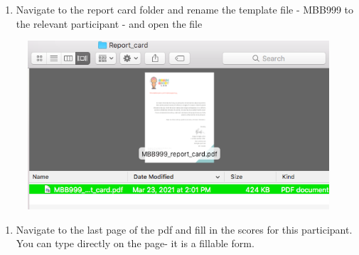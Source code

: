 \documentclass[]{book}
\providecommand{\tightlist}{%
  \setlength{\itemsep}{0pt}\setlength{\parskip}{0pt}}
\begin{document}
\begin{enumerate}
\def\labelenumi{\arabic{enumi}.}
\setcounter{enumi}{1}
\tightlist
\item
  Navigate to the report card folder and rename the template file - MBB999 to the relevant participant - and open the file
\end{enumerate}

\begin{figure}
\centering
\includegraphics{images/report_card_online/2.png}
\caption{}
\end{figure}

\begin{enumerate}
\def\labelenumi{\arabic{enumi}.}
\setcounter{enumi}{2}
\tightlist
\item
  Navigate to the last page of the pdf and fill in the scores for this participant. You can type directly on the page- it is a fillable form.
\end{enumerate}
\end{document}
